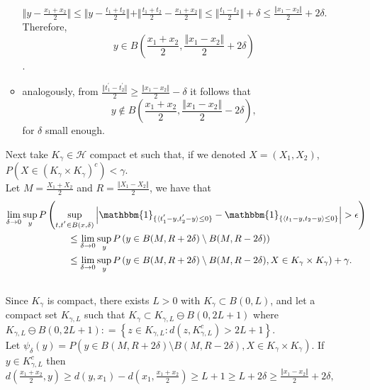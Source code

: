 \documentclass[a4paper]{article}
\def\defeq{\mathrel{\mathop:}=}
\numberwithin{equation}{section}
\def\defeq{\mathrel{\mathop:}=}
\newcommand{\I}{\mathbbm{1}}
\begin{document}
\begin{enumerate}[label=(\Alph*)]
\begin{itemize}
$ \Vert y -\frac{x_1+x_2}{2} \Vert \leq \Vert y -\frac{t_1+t_2}{2} \Vert + \Vert \frac{t_1+t_2}{2} -\frac{x_1+x_2}{2} \Vert \leq  \Vert \frac{t_1-t_2}{2}\Vert+ \delta \leq \frac{\Vert x_1-x_2\Vert}{2} +2\delta $. Therefore, 
$$ y \in B \left(\frac{x_1+x_2}{2}, \frac{ \Vert x_1- x_2 \Vert}{2} + 2\delta\right)$$.
\item  analogously, from $\frac{\Vert t^{'}_1 -t^{'}_2\Vert}{2} \geq \frac{\Vert x_1 - x_2\Vert}{2} - \delta$ it follows that $$y \notin B \left(\frac{x_1+x_2}{2}, \frac{ \Vert x_1- x_2 \Vert}{2} -2 \delta\right),$$
for $\delta$ small enough.
\end{itemize} 
Next take $K_\gamma  \in \mathcal{H} $ compact %
et such that, if we denoted $X=(X_1,X_2)$,   $P\left( X \in  (K_\gamma \times K_\gamma)^c  \right)< \gamma$. 
\\
Let $M =  \frac{X_1+X_2}{2}$ and   $R=\frac{\Vert X_1- X_2 \Vert }{2}$,  we have that
 \begin{align*}
  \lim_{\delta \rightarrow 0} \sup_y P \left(  \sup_{t, t^{'} \in B(x, \delta)} \left \vert \I_{ \{ \langle t^{'}_1-y, t^{'}_2-y \rangle \leq 0\} }  - \I_{ \{ \langle t_1-y, t_2-y \rangle \leq 0 \} } \right\vert >\epsilon \right)  \\
  & \hspace{-11cm} \leq   \lim_{\delta \rightarrow 0} \sup_y P \left( y \in   B(M, R+ 2\delta)   \setminus  B(M, R- 2\delta) \right)   \\
& \hspace{-11cm}    \leq   \lim_{\delta \rightarrow 0} \sup_y P \left( y \in   B(M, R+ 2\delta)   \setminus  B(M, R- 2\delta) , X \in  K_{\gamma} \times K_{\gamma} \right) +\gamma. 
  \end{align*}  
 \\
Since $K_\gamma$ is compact, there exists  $L>0$ with   $K_\gamma \subset B(0,L)$, and  let a compact set $K_{\gamma,L}$   such that   $K_{\gamma} \subset K_{\gamma,L} \ominus  B(0,2L+1)$ %
where $K_{\gamma,L} \ominus  B(0,2L+1) \defeq  \left \{ z \in  K_{\gamma,L} : d \left( z,  K^c_{\gamma,L} \right) > 2L +1 \right \}$.
\\
 Let 
$\psi_{\delta}(y) = P \left( y \in   B(M, R+ 2\delta)   \setminus  B(M, R- 2\delta) , X \in  K_{\gamma} \times K_{\gamma} \right)$. %
If $y \in K^c_{\gamma,L}$  then  
$d \left(\frac{x_1+x_2}{2},y \right) \geq d \left(y,x_1 \right) - d\left(x_1,\frac{x_1+x_2}{2}\right) \geq L+1 \geq L + 2\delta \geq  \frac{\Vert x_1 - x_2 \Vert}{2} + 2\delta, $ 

\end{enumerate}
\end{document}
